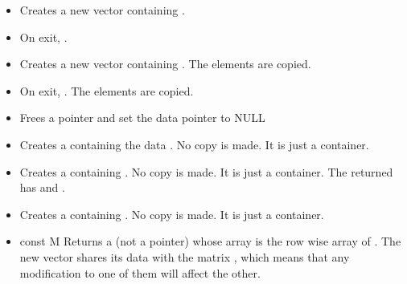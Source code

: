\begin{itemize}
\item {}
  \sshortdescribe Creates a new vector containing .

\item {}
  \sshortdescribe On exit, .

\item {}
  \sshortdescribe Creates a new vector containing . The
  elements are copied.
  
\item {}
  \sshortdescribe On exit, .  The
  elements are copied.

\item {}
  \sshortdescribe Frees a  pointer and set the data pointer to NULL  
\item {}
    \sshortdescribe Creates a  containing the data 
  . No copy is made. It is just a container.
  
\item {}
  \sshortdescribe Creates a  containing
  . No copy is made. It is just a container. The returned
   has  and .

\item {}
  \sshortdescribe Creates a  containing . No
  copy is made. It is just a container.

\item {}
  {const  \ptr M}
  \sshortdescribe Returns a  (not a pointer) whose array is
  the row wise array of . The new vector shares its data with the
  matrix , which means that any modification to one of them will affect
  the other.
\end{itemize}

